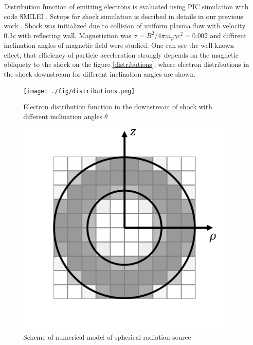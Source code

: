 \documentclass[a4paper,12pt]{extreport}
\begin{document}
Distribution function of emitting electrons is evaluated using PIC simulation with code SMILEI \cite{Derouillat}. Setups for shock simulation is decribed in details in our previous work \cite{BykovUniverse}. Shock was initialized due to collision of uniform plasma flow with velocity $0.3 c$ with reflecting wall. Magnetiztion was $\sigma = B^2/4 \pi m_p \gamma c^2 = 0.002$ and diffirent inclination angles of magnetic field were studied. One can see the well-known effect, that efficiency of particle acceleration strongly depends on the magnetic obliquety to the shock \cite{SironiSpitkovsky2009pair, Crumley2019, GuoSironi2014_1, Romansky2018} on the figure \ref{distributions}, where electron distributions in the shock downstream for different inclination angles are shown.


\begin{figure}[h!]
	\centering
	\begin{minipage}{0.48\textwidth}
		\centering
		\texttt{[image: ./fig/distributions.png]} 
		\caption{Electron distribution function in the downstream of shock with different inclination angles $\theta$}
		\label{distributions}
	\end{minipage}\hfill
	\begin{minipage}{0.48\textwidth}
		\centering
		\includegraphics[width=0.98\textwidth]{./fig/sphericalSource.png} 
		\caption{Scheme of numerical model of spherical radiation source}
		\label{sphericalSource}
	\end{minipage}
\end{figure}
\end{document}
